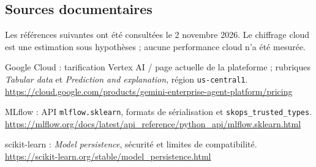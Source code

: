 \documentclass[11pt,a4paper]{article}
\begin{document}
\subsection*{Sources documentaires}
Les références suivantes ont été consultées le 2 novembre 2026. Le chiffrage cloud est une estimation sous hypothèses ; aucune performance cloud n'a été mesurée.

{\footnotesize\noindent [1] Google Cloud : tarification Vertex AI / page actuelle de la plateforme ; rubriques \emph{Tabular data} et \emph{Prediction and explanation}, région \texttt{us-central1}.\\
\url{https://cloud.google.com/products/gemini-enterprise-agent-platform/pricing}\par}\medskip
{\footnotesize\noindent [2] MLflow : API \texttt{mlflow.sklearn}, formats de sérialisation et \texttt{skops\_trusted\_types}.\\
\url{https://mlflow.org/docs/latest/api_reference/python_api/mlflow.sklearn.html}\par}\medskip
{\footnotesize\noindent [3] scikit-learn : \emph{Model persistence}, sécurité et limites de compatibilité.\\
\url{https://scikit-learn.org/stable/model_persistence.html}\par}
\end{document}
